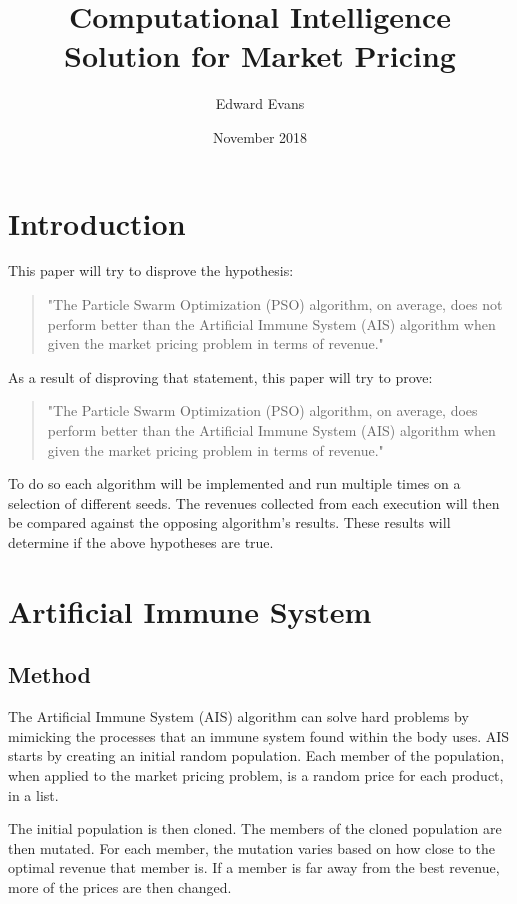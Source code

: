 \documentclass{article}
\title{Computational Intelligence Solution for Market Pricing}
\author{Edward Evans}
\date{November 2018}
\begin{document}
\maketitle

\section{Introduction}

This paper will try to disprove the hypothesis:
\begin{quote}
"The Particle Swarm Optimization (PSO) algorithm, on average, does not perform better than the Artificial Immune System (AIS) algorithm when given the market pricing problem in terms of revenue."
\end{quote}

As a result of disproving that statement, this paper will try to prove:
\begin{quote}
"The Particle Swarm Optimization (PSO) algorithm, on average, does perform better than the Artificial Immune System (AIS) algorithm when given the market pricing problem in terms of revenue."
\end{quote}

To do so each algorithm will be implemented and run multiple times on a selection of different seeds. The revenues collected from each execution will then be compared against the opposing algorithm's results. These results will determine if the above hypotheses are true.

\section{Artificial Immune System}
\subsection{Method}

The Artificial Immune System (AIS) algorithm can solve hard problems by mimicking the processes that an immune system found within the body uses. AIS starts by creating an initial random population. Each member of the population, when applied to the market pricing problem, is a random price for each product, in a list.

The initial population is then cloned. The members of the cloned population are then mutated. For each member, the mutation varies based on how close to the optimal revenue that member is. If a member is far away from the best revenue, more of the prices are then changed.
\end{document}
